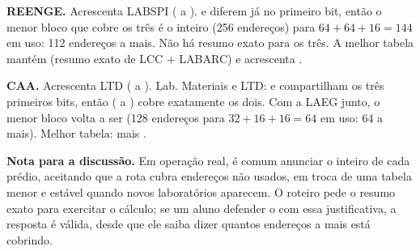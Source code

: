 \documentclass[11pt,a4paper]{article}
\begin{document}
\begin{gabarito}
\textbf{REENGE.} Acrescenta LABSPI ( a ).  e  diferem já no primeiro bit, então o menor bloco que cobre os três é o  inteiro (256 endereços) para $64 + 64 + 16 = 144$ em uso: 112 endereços a mais. Não há resumo exato para os três. A melhor tabela mantém  (resumo exato de LCC + LABARC) e acrescenta .

\textbf{CAA.} Acrescenta LTD ( a ). Lab. Materiais e LTD:  e  compartilham os três primeiros bits, então  ( a ) cobre exatamente os dois. Com a LAEG junto, o menor bloco volta a ser  (128 endereços para $32 + 16 + 16 = 64$ em uso: 64 a mais). Melhor tabela:  mais .

\textbf{Nota para a discussão.} Em operação real, é comum anunciar o  inteiro de cada prédio, aceitando que a rota cubra endereços não usados, em troca de uma tabela menor e estável quando novos laboratórios aparecem. O roteiro pede o resumo exato para exercitar o cálculo; se um aluno defender o  com essa justificativa, a resposta é válida, desde que ele saiba dizer quantos endereços a mais está cobrindo.
\end{gabarito}

%
%
\end{document}
